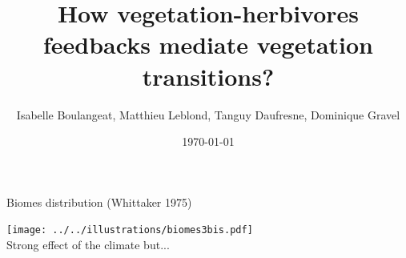 \documentclass[10pt,aspectratio=149]{beamer}
\author[]{Isabelle Boulangeat, Matthieu Leblond, Tanguy Daufresne, Dominique Gravel}
\title[]{How vegetation-herbivores feedbacks mediate vegetation transitions?}
\date[]{\today}
\begin{document}

\begin{frame}[plain]

\titlepage

\end{frame}



\begin{frame}{Biomes distribution (Whittaker 1975)}

\centering
\texttt{[image: ../../illustrations/biomes3bis.pdf]}\\
\vspace{1em}
Strong effect of the climate but...\\

\end{frame}

\end{document}
